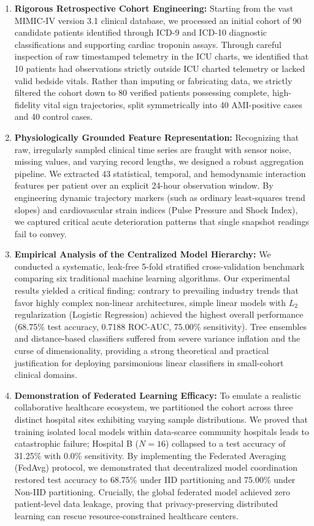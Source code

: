 \begin{enumerate}
    \item \textbf{Rigorous Retrospective Cohort Engineering:} Starting from the vast MIMIC-IV version 3.1 clinical database, we processed an initial cohort of 90 candidate patients identified through ICD-9 and ICD-10 diagnostic classifications and supporting cardiac troponin assays. Through careful inspection of raw timestamped telemetry in the ICU charts, we identified that 10 patients had observations strictly outside ICU charted telemetry or lacked valid bedside vitals. Rather than imputing or fabricating data, we strictly filtered the cohort down to 80 verified patients possessing complete, high-fidelity vital sign trajectories, split symmetrically into 40 AMI-positive cases and 40 control cases.
    
    \item \textbf{Physiologically Grounded Feature Representation:} Recognizing that raw, irregularly sampled clinical time series are fraught with sensor noise, missing values, and varying record lengths, we designed a robust aggregation pipeline. We extracted 43 statistical, temporal, and hemodynamic interaction features per patient over an explicit 24-hour observation window. By engineering dynamic trajectory markers (such as ordinary least-squares trend slopes) and cardiovascular strain indices (Pulse Pressure and Shock Index), we captured critical acute deterioration patterns that single snapshot readings fail to convey.
    
    \item \textbf{Empirical Analysis of the Centralized Model Hierarchy:} We conducted a systematic, leak-free 5-fold stratified cross-validation benchmark comparing six traditional machine learning algorithms. Our experimental results yielded a critical finding: contrary to prevailing industry trends that favor highly complex non-linear architectures, simple linear models with $L_2$ regularization (Logistic Regression) achieved the highest overall performance (68.75\% test accuracy, 0.7188 ROC-AUC, 75.00\% sensitivity). Tree ensembles and distance-based classifiers suffered from severe variance inflation and the curse of dimensionality, providing a strong theoretical and practical justification for deploying parsimonious linear classifiers in small-cohort clinical domains.
    
    \item \textbf{Demonstration of Federated Learning Efficacy:} To emulate a realistic collaborative healthcare ecosystem, we partitioned the cohort across three distinct hospital sites exhibiting varying sample distributions. We proved that training isolated local models within data-scarce community hospitals leads to catastrophic failure; Hospital B ($N=16$) collapsed to a test accuracy of 31.25\% with 0.0\% sensitivity. By implementing the Federated Averaging (FedAvg) protocol, we demonstrated that decentralized model coordination restored test accuracy to 68.75\% under IID partitioning and 75.00\% under Non-IID partitioning. Crucially, the global federated model achieved zero patient-level data leakage, proving that privacy-preserving distributed learning can rescue resource-constrained healthcare centers.
    

\end{enumerate}
